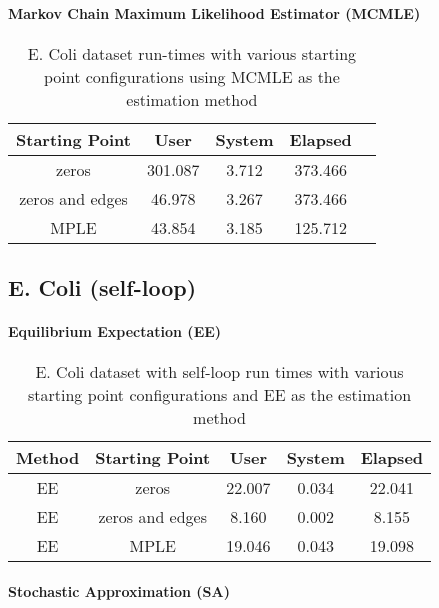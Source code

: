 \paragraph{Markov Chain Maximum Likelihood Estimator (MCMLE)}

\begin{table}[!ht]
\centering
 \begin{tabular}{||c | c | c | c | c||} 
 \hline
 Starting Point & User & System & Elapsed \\ 
 \hline
 zeros & 301.087 & 3.712 & 373.466 \\
 \hline
 zeros and edges & 46.978 & 3.267 & 373.466 \\ 
 \hline
 MPLE & 43.854 & 3.185 & 125.712 \\ 
 \hline
\end{tabular}
\label{t:ecoli1_mcmle}
\caption{E. Coli dataset run-times with various starting point configurations using MCMLE as the estimation method}
\end{table}

\subsection{E. Coli (self-loop)}

\paragraph{Equilibrium Expectation (EE)}

\begin{table}[!ht]
\centering
 \begin{tabular}{||c | c | c | c | c||} 
 \hline
 Method & Starting Point & User & System & Elapsed \\
 \hline\hline
 EE & zeros & 22.007	 & 0.034 & 22.041 \\ 
 \hline
 EE & zeros and edges & 8.160 & 0.002 & 8.155 \\
 \hline
 EE & MPLE & 19.046 & 0.043 & 19.098 \\
 \hline
 \end{tabular}
 \label{t:ecoli2_ee}
 \caption{E. Coli dataset with self-loop run times with various starting point configurations and EE as the estimation method}
\end{table}

\paragraph{Stochastic Approximation (SA)}

